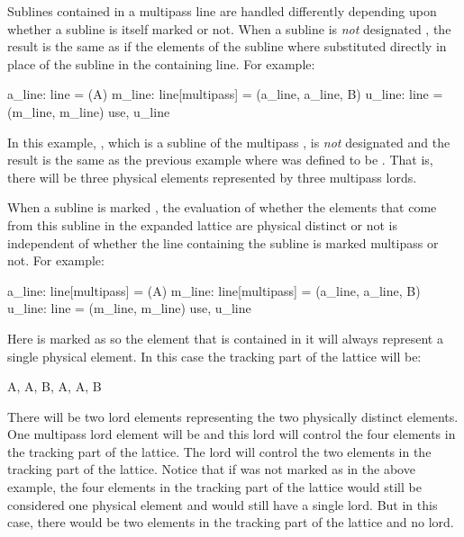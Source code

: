 Sublines contained in a multipass line are handled differently
depending upon whether a subline is itself marked  or
not. When a subline is {\em not} designated , the result
is the same as if the elements of the subline where substituted directly
in place of the subline in the containing line. For example:
\begin{example}
  a_line: line = (A)
  m_line: line[multipass] = (a_line, a_line, B)
  u_line: line = (m_line, m_line)
  use, u_line
\end{example}
In this example, , which is a subline of the multipass
, is {\em not} designated  and the result
is the same as the previous example where  was defined
to be . That is, there will be three physical elements
represented by three multipass lords.

When a subline is marked , the evaluation of whether the
elements that come from this subline in the expanded lattice are
physical distinct or not is independent of whether the line
containing the subline is marked multipass or not. For example:
\begin{example}
  a_line: line[multipass] = (A)
  m_line: line[multipass] = (a_line, a_line, B)
  u_line: line = (m_line, m_line)
  use, u_line
\end{example}
Here  is marked as  so the  element
that is contained in it will always represent a single physical 
element. In this case the tracking part of the lattice will be:
\begin{example}
  A, A, B, A, A, B
\end{example}
There will be two lord elements representing the two physically
distinct elements. One multipass lord element will be  and this
lord will control the four  elements in the tracking part of
the lattice. The  lord will control the two  elements
in the tracking part of the lattice. Notice that if  was not
marked as  in the above example, the four  elements
in the tracking part of the lattice would still be considered one physical 
element and would still have a single  lord. But in this case,
there would be two  elements in the tracking part of the lattice
and no  lord.

